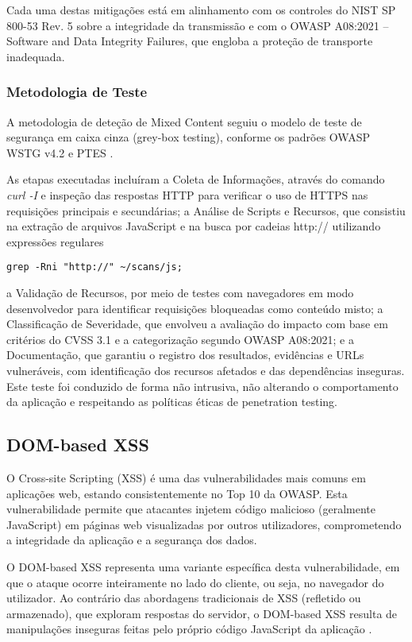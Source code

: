 Cada uma destas mitigações está em alinhamento com os controles do NIST SP 800-53 Rev. 5 sobre a integridade da transmissão e com o OWASP A08:2021 – Software and Data Integrity Failures, que engloba a proteção de transporte inadequada.

\subsubsection{Metodologia de Teste}
\label{subsubsec:metogologia-teste-MC}

A metodologia de deteção de Mixed Content seguiu o modelo de teste de segurança em caixa cinza (grey-box testing), conforme os padrões OWASP WSTG v4.2 e PTES \cite{ref1}. 

As etapas executadas incluíram a Coleta de Informações, através do comando \textit{curl -I} e inspeção das respostas HTTP para verificar o uso de HTTPS nas requisições principais e secundárias; a Análise de Scripts e Recursos, que consistiu na extração de arquivos JavaScript e na busca por cadeias http:// utilizando expressões regulares 
\begin{verbatim}
grep -Rni "http://" ~/scans/js; 
\end{verbatim}
a Validação de Recursos, por meio de testes com navegadores em modo desenvolvedor para identificar requisições bloqueadas como conteúdo misto; a Classificação de Severidade, que envolveu a avaliação do impacto com base em critérios do CVSS 3.1 \cite{ref46} e a categorização segundo OWASP A08:2021; e a Documentação, que garantiu o registro dos resultados, evidências e URLs vulneráveis, com identificação dos recursos afetados e das dependências inseguras. Este teste foi conduzido de forma não intrusiva, não alterando o comportamento da aplicação e respeitando as políticas éticas de penetration testing.

\subsection{DOM-based XSS}
\label{subsec:dom-based-xss}

O Cross-site Scripting (XSS) é uma das vulnerabilidades mais comuns em aplicações web, estando consistentemente no Top 10 da OWASP. Esta vulnerabilidade permite que atacantes injetem código malicioso (geralmente JavaScript) em páginas web visualizadas por outros utilizadores, comprometendo a integridade da aplicação e a segurança dos dados.

O DOM-based XSS representa uma variante específica desta vulnerabilidade, em que o ataque ocorre inteiramente no lado do cliente, ou seja, no navegador do utilizador. Ao contrário das abordagens tradicionais de XSS (refletido ou armazenado), que exploram respostas do servidor, o DOM-based XSS resulta de manipulações inseguras feitas pelo próprio código JavaScript da aplicação \cite{ref30}.


